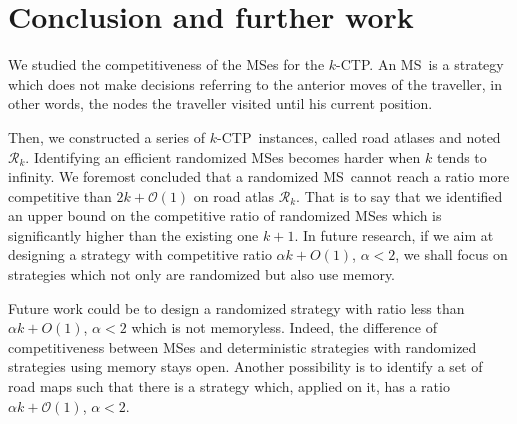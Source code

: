 \documentclass[preprint]{elsarticle}
\newcommand{\kctp}{$k$-CTP}
\newcommand{\mcalr}{\mathcal{R}}
\newcommand{\mts}{MS}
\begin{document}
\section{Conclusion and further work} \label{sec:conclusion}

We studied the competitiveness of the \mts es for the \kctp. An \mts ~is a strategy which does not make decisions referring to the anterior moves of the traveller, in other words, the nodes the traveller visited until his current position.

Then, we constructed a series of \kctp ~instances, called road atlases and noted $\mcalr_k$. Identifying an efficient randomized \mts{}es becomes harder when $k$ tends to infinity. We foremost concluded that a randomized  \mts ~cannot reach a ratio more competitive than $2k+\mathcal{O}\left(1\right)$ on road atlas $\mcalr_k$. That is to say that we identified an upper bound on the competitive ratio of randomized \mts{}es which is significantly higher than the existing one $k+1$. In future research, if we aim at designing a strategy with competitive ratio $\alpha k + O\left(1\right)$, $\alpha < 2$, we shall focus on strategies which not only are randomized but also use memory.

Future work could be to design a randomized strategy with ratio less than $\alpha k + O\left(1\right)$, $\alpha < 2$ which is not memoryless. Indeed, the difference of competitiveness between \mts es and deterministic strategies with randomized strategies using memory stays open. Another possibility is to identify a set of road maps such that there is a strategy which, applied on it, has a ratio $\alpha k+\mathcal{O}\left(1\right)$, $\alpha < 2$.



\end{document}
